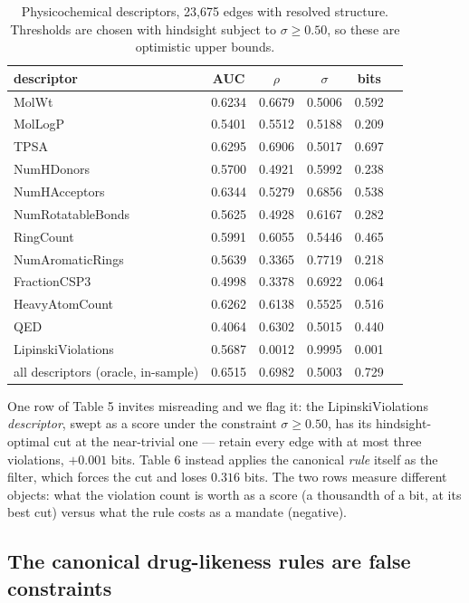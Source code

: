 \documentclass[11pt]{article}
\begin{document}
\begin{table}[t]
\centering
\caption{Physicochemical descriptors, 23{,}675 edges with resolved structure.
Thresholds are chosen with hindsight subject to $\sigma \geq 0.50$, so these
are optimistic upper bounds.}
\begin{tabular}{lccccc}
\toprule
descriptor & AUC & $\rho$ & $\sigma$ & bits \\
\midrule
MolWt & 0.6234 & 0.6679 & 0.5006 & 0.592 \\
MolLogP & 0.5401 & 0.5512 & 0.5188 & 0.209 \\
TPSA & 0.6295 & 0.6906 & 0.5017 & 0.697 \\
NumHDonors & 0.5700 & 0.4921 & 0.5992 & 0.238 \\
NumHAcceptors & 0.6344 & 0.5279 & 0.6856 & 0.538 \\
NumRotatableBonds & 0.5625 & 0.4928 & 0.6167 & 0.282 \\
RingCount & 0.5991 & 0.6055 & 0.5446 & 0.465 \\
NumAromaticRings & 0.5639 & 0.3365 & 0.7719 & 0.218 \\
FractionCSP3 & 0.4998 & 0.3378 & 0.6922 & 0.064 \\
HeavyAtomCount & 0.6262 & 0.6138 & 0.5525 & 0.516 \\
QED & 0.4064 & 0.6302 & 0.5015 & 0.440 \\
LipinskiViolations & 0.5687 & 0.0012 & 0.9995 & 0.001 \\
all descriptors (oracle, in-sample) & 0.6515 & 0.6982 & 0.5003 & 0.729 \\
\bottomrule
\end{tabular}
\end{table}

One row of Table 5 invites misreading and we flag it: the
LipinskiViolations \emph{descriptor}, swept as a score under the constraint
$\sigma \geq 0.50$, has its hindsight-optimal cut at the near-trivial one ---
retain every edge with at most three violations, $+0.001$ bits. Table 6 instead applies the canonical
\emph{rule} itself as the filter, which forces the cut and loses $0.316$
bits. The two rows measure different objects: what the violation count is
worth as a score (a thousandth of a bit, at its best cut) versus what the rule costs as a
mandate (negative).

\subsection{The canonical drug-likeness rules are false constraints}
\end{document}
